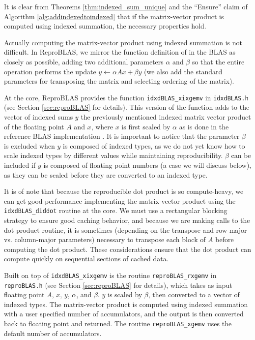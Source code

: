   It is clear from Theorems \ref{thm:indexed_sum_unique} and the ``Ensure'' claim of Algorithm \ref{alg:addindexedtoindexed} that if the matrix-vector product is computed using indexed summation, the necessary properties hold.

  Actually computing the matrix-vector product using indexed summation is not difficult. In ReproBLAS, we mirror the function definition of  in the BLAS as closely as possible, adding two additional parameters $\alpha$ and $\beta$ so that the entire operation performs the update $y \gets \alpha Ax + \beta y$ (we also add the standard parameters for transposing the matrix and selecting ordering of the matrix).

  At the core, ReproBLAS provides the function \texttt{idxdBLAS\_xixgemv} in \texttt{idxdBLAS.h} (see Section \ref{sec:reproBLAS} for details). This version of the function adds to the vector of indexed sums $y$ the previously mentioned indexed matrix vector product of the floating point $A$ and $x$, where $x$ is first scaled by $\alpha$ as is done in the reference BLAS implementation \cite{BLAS}. It is important to notice that the parameter $\beta$ is excluded when $y$ is composed of indexed types, as we do not yet know how to scale indexed types by different values while maintaining reproducibility. $\beta$ can be included if $y$ is composed of floating point numbers (a case we will discuss below), as they can be scaled before they are converted to an indexed type.

  It is of note that because the reproducible dot product is so compute-heavy, we can get good performance implementing the matrix-vector product using the \texttt{idxdBLAS\_diddot} routine at the core. We must use a rectangular blocking strategy to ensure good caching behavior, and because we are making calls to the dot product routine, it is sometimes (depending on the transpose and row-major vs. column-major parameters) necessary to transpose each block of $A$ before computing the dot product. These considerations ensure that the dot product can compute quickly on sequential sections of cached data.

  Built on top of \texttt{idxdBLAS\_xixgemv} is the routine \texttt{reproBLAS\_rxgemv} in \texttt{reproBLAS.h} (see Section \ref{sec:reproBLAS} for details), which takes as input floating point $A$, $x$, $y$, $\alpha$, and $\beta$. $y$ is scaled by $\beta$, then converted to a vector of indexed types. The matrix-vector product is computed using indexed summation with a user specified number of accumulators, and the output is then converted back to floating point and returned. The routine \texttt{reproBLAS\_xgemv} uses the default number of accumulators.
